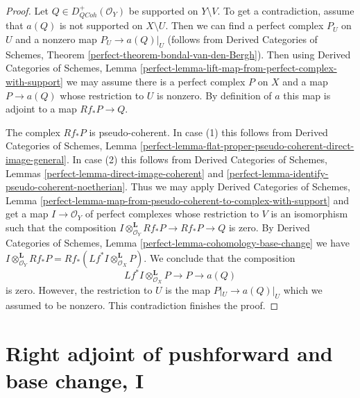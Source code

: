 \documentclass{stacks-project}
\theoremstyle{plain}
\theoremstyle{definition}
\theoremstyle{remark}
\numberwithin{equation}{subsection}
\def\QCoh{\mathit{QCoh}}
\begin{document}
\begin{proof}
Let $Q \in D^+_\QCoh(\mathcal{O}_Y)$ be supported on $Y \setminus V$.
To get a contradiction, assume that $a(Q)$ is not supported on
$X \setminus U$. Then we can find a perfect complex $P_U$ on $U$
and a nonzero map $P_U \to a(Q)|_U$ (follows from
Derived Categories of Schemes, Theorem
\ref{perfect-theorem-bondal-van-den-Bergh}). Then using
Derived Categories of Schemes, Lemma
\ref{perfect-lemma-lift-map-from-perfect-complex-with-support}
we may assume there is a perfect complex $P$ on $X$ and a map
$P \to a(Q)$ whose restriction to $U$ is nonzero.
By definition of $a$ this map
is adjoint to a map $Rf_*P \to Q$.

\medskip\noindent
The complex $Rf_*P$ is pseudo-coherent. In case (1) this follows
from Derived Categories of Schemes, Lemma
\ref{perfect-lemma-flat-proper-pseudo-coherent-direct-image-general}.
In case (2) this follows from
Derived Categories of Schemes, Lemmas
\ref{perfect-lemma-direct-image-coherent} and
\ref{perfect-lemma-identify-pseudo-coherent-noetherian}.
Thus we may apply
Derived Categories of Schemes, Lemma
\ref{perfect-lemma-map-from-pseudo-coherent-to-complex-with-support}
and get a map $I \to \mathcal{O}_Y$ of perfect complexes
whose restriction to $V$ is an isomorphism such that the composition
$I \otimes^\mathbf{L}_{\mathcal{O}_Y} Rf_*P \to Rf_*P \to Q$ is zero.
By Derived Categories of Schemes, Lemma
\ref{perfect-lemma-cohomology-base-change}
we have $I \otimes^\mathbf{L}_{\mathcal{O}_Y} Rf_*P =
Rf_*(Lf^*I \otimes^\mathbf{L}_{\mathcal{O}_X} P)$.
We conclude that the composition
$$
Lf^*I \otimes^\mathbf{L}_{\mathcal{O}_X} P \to P \to a(Q)
$$
is zero. However, the restriction to $U$ is the map
$P|_U \to a(Q)|_U$ which we assumed to be nonzero.
This contradiction finishes the proof.
\end{proof}












\section{Right adjoint of pushforward and base change, I}
\label{section-base-change-map}
\end{document}

